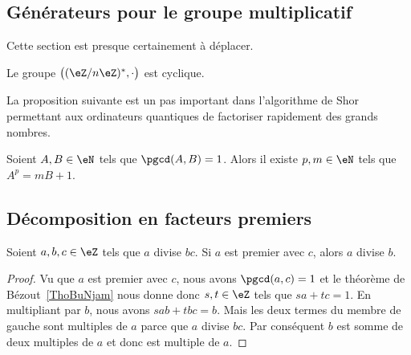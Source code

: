 \subsection{Générateurs pour le groupe multiplicatif}

Cette section est presque certainement à déplacer. 

\begin{proposition}       \label{PROPooKSCRooPyInSv}
    Le groupe \( \big( (\eZ/n\eZ)^*, \cdot\big)\) est cyclique.
\end{proposition}

La proposition suivante est un pas important dans l'algorithme de Shor permettant aux ordinateurs quantiques de factoriser rapidement des grands nombres.

\begin{proposition}       \label{PROPooZCKXooOtocKE}
    Soient \( A,B\in \eN\) tels que \( \pgcd(A,B)=1\). Alors il existe \( p,m\in \eN\) tels que \( A^p=mB+1\).
\end{proposition}

\subsection{Décomposition en facteurs premiers}

\begin{lemma}    \label{LemPRuUrsD}
    Soient \( a,b,c\in \eZ\) tels que \( a\) divise \( bc\). Si \( a\) est premier avec \( c\), alors \( a\) divise \( b\).
\end{lemma}

\begin{proof}
    Vu que \( a\) est premier avec \( c\), nous avons \( \pgcd(a,c)=1\) et le théorème de Bézout~\ref{ThoBuNjam} nous donne donc \( s,t\in \eZ\) tels que \( sa+tc=1\). En multipliant par \( b\), nous avons $sab+tbc=b$. Mais les deux termes du membre de gauche sont multiples de \( a\) parce que \( a\) divise \( bc\). Par conséquent \( b\) est somme de deux multiples de \( a\) et donc est multiple de \( a\).
\end{proof}

